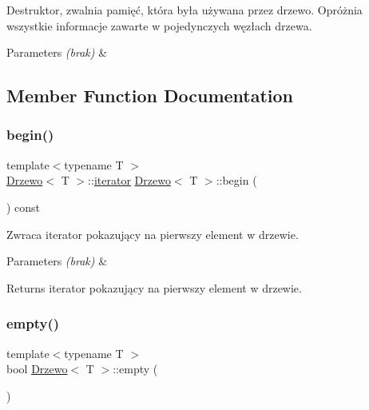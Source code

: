 Destruktor, zwalnia pamięć, która była używana przez drzewo. Opróżnia wszystkie informacje zawarte w pojedynczych węzłach drzewa.


\begin{DoxyParams}{Parameters}
{\em (brak)} & \\
\hline
\end{DoxyParams}


\subsection{Member Function Documentation}
\mbox{\label{class_drzewo_a2f6661025ebf9a3f6c2df1726a0d46ca}} 
\subsubsection{\texorpdfstring{begin()}{begin()}}
{\footnotesize\ttfamily template$<$typename T $>$ \\
\hyperlink{class_drzewo}{Drzewo}$<$ T $>$\+::\hyperlink{class_drzewo_1_1iterator}{iterator} \hyperlink{class_drzewo}{Drzewo}$<$ T $>$\+::begin (\begin{DoxyParamCaption}{ }\end{DoxyParamCaption}) const\hspace{0.3cm}{\ttfamily [inline]}}

Zwraca iterator pokazujący na pierwszy element w drzewie.


\begin{DoxyParams}{Parameters}
{\em (brak)} & \\
\hline
\end{DoxyParams}
\begin{DoxyReturn}{Returns}
iterator pokazujący na pierwszy element w drzewie. 
\end{DoxyReturn}
\mbox{\label{class_drzewo_abee09a10667c74ea82f4325addfac3df}} 
\subsubsection{\texorpdfstring{empty()}{empty()}}
{\footnotesize\ttfamily template$<$typename T $>$ \\
bool \hyperlink{class_drzewo}{Drzewo}$<$ T $>$\+::empty (\begin{DoxyParamCaption}{ }\end{DoxyParamCaption})\hspace{0.3cm}{\ttfamily [inline]}}

